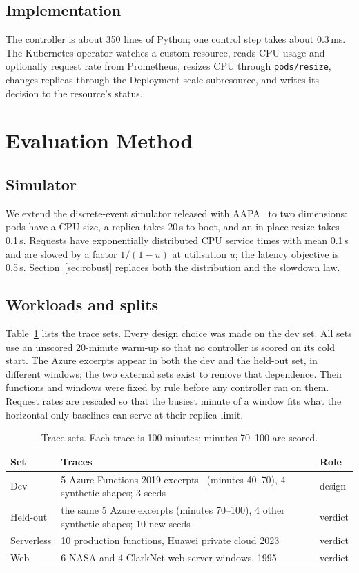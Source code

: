 \documentclass[conference]{IEEEtran}
\begin{document}
\subsection{Implementation}

The controller is about 350 lines of Python; one control step takes about 0.3\,ms. The
Kubernetes operator watches a custom resource, reads CPU usage and optionally request rate
from Prometheus, resizes CPU through \texttt{pods/resize}, changes replicas through the
Deployment scale subresource, and writes its decision to the resource's status.

\section{Evaluation Method}
\label{sec:method}

\subsection{Simulator}

We extend the discrete-event simulator released with AAPA~\cite{aapa} to two dimensions:
pods have a CPU size, a replica takes 20\,s to boot, and an in-place resize takes 0.1\,s.
Requests have exponentially distributed CPU service times with mean 0.1\,s and are slowed
by a factor $1/(1-u)$ at utilisation $u$; the latency objective is 0.5\,s.
Section~\ref{sec:robust} replaces both the distribution and the slowdown law.

\subsection{Workloads and splits}

Table~\ref{tab:sets} lists the trace sets. Every design choice was made on the dev set.
All sets use an unscored 20-minute warm-up so that no controller is scored on its cold
start. The Azure excerpts appear in both the dev and the held-out set, in different
windows; the two external sets exist to remove that dependence. Their functions and windows
were fixed by rule before any controller ran on them. Request rates are rescaled so that
the busiest minute of a window fits what the horizontal-only baselines can serve at their
replica limit.

\begin{table}[t]
\caption{Trace sets. Each trace is 100 minutes; minutes 70--100 are scored.}
\label{tab:sets}
\centering
\begin{tabular}{@{}lp{4.4cm}l@{}}
\toprule
Set & Traces & Role \\
\midrule
Dev & 5 Azure Functions 2019 excerpts~\cite{shahrad} (minutes 40--70), 4 synthetic shapes; 3 seeds & design \\
Held-out & the same 5 Azure excerpts (minutes 70--100), 4 other synthetic shapes; 10 new seeds & verdict \\
Serverless & 10 production functions, Huawei private cloud 2023~\cite{huawei} & verdict \\
Web & 6 NASA and 4 ClarkNet web-server windows, 1995~\cite{ita} & verdict \\
\bottomrule
\end{tabular}
\end{table}
\end{document}
